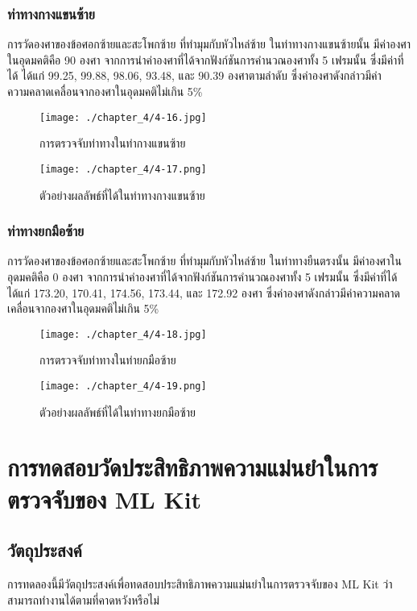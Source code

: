 \subsubsection{ท่าทางกางแขนซ้าย}
การวัดองศาของข้อศอกซ้ายและสะโพกซ้าย ที่ทำมุมกับหัวไหล่ซ้าย ในท่าทางกางแขนซ้ายนั้น มีค่าองศาในอุดมคติคือ 90 องศา จากการนำค่าองศาที่ได้จากฟังก์ชันการคำนวณองศาทั้ง 5 เฟรมนั้น ซึ่งมีค่าที่ได้ ได้แก่ 99.25, 99.88, 98.06, 93.48, และ 90.39 องศาตามลำดับ ซึ่งค่าองศาดังกล่าวมีค่าความคลาดเคลื่อนจากองศาในอุดมคติไม่เกิน 5\%
\begin{figure}
	\texttt{[image: ./chapter\_4/4-16.jpg]}
	\caption{การตรวจจับท่าทางในท่ากางแขนซ้าย}
\end{figure}
\begin{figure}
	\texttt{[image: ./chapter\_4/4-17.png]}
	\caption{ตัวอย่างผลลัพธ์ที่ได้ในท่าทางกางแขนซ้าย}
\end{figure}
\subsubsection{ท่าทางยกมือซ้าย}
การวัดองศาของข้อศอกซ้ายและสะโพกซ้าย ที่ทำมุมกับหัวไหล่ซ้าย ในท่าทางยืนตรงนั้น มีค่าองศาในอุดมคติคือ 0 องศา จากการนำค่าองศาที่ได้จากฟังก์ชันการคำนวณองศาทั้ง 5 เฟรมนั้น ซึ่งมีค่าที่ได้ ได้แก่ 173.20, 170.41, 174.56, 173.44, และ 172.92 องศา ซึ่งค่าองศาดังกล่าวมีค่าความคลาดเคลื่อนจากองศาในอุดมคติไม่เกิน 5\%
\begin{figure}
	\texttt{[image: ./chapter\_4/4-18.jpg]}
	\caption{การตรวจจับท่าทางในท่ายกมือซ้าย}
\end{figure}
\begin{figure}
	\texttt{[image: ./chapter\_4/4-19.png]}
	\caption{ตัวอย่างผลลัพธ์ที่ได้ในท่าทางยกมือซ้าย}
\end{figure}

\section{การทดสอบวัดประสิทธิภาพความแม่นยำในการตรวจจับของ ML Kit}
\subsection{วัตถุประสงค์}
การทดลองนี้มีวัตถุประสงค์เพื่อทดสอบประสิทธิภาพความแม่นยำในการตรวจจับของ ML Kit ว่าสามารถทำงานได้ตามที่คาดหวังหรือไม่
